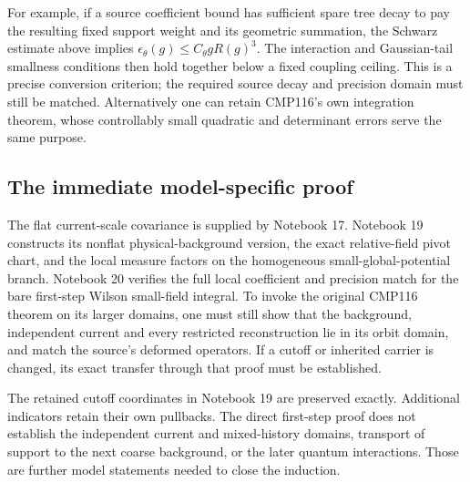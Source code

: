 For example, if a source coefficient bound has sufficient spare
tree decay to pay the resulting fixed support weight and its
geometric summation, the Schwarz estimate above implies
$\epsilon_\theta(g)\le C_\theta gR(g)^3$.
The interaction and Gaussian-tail smallness conditions then hold
together below a fixed coupling ceiling. This is a precise
conversion criterion; the required source decay and precision
domain must still be matched. Alternatively one can retain
CMP116's own integration theorem, whose controllably small
quadratic and determinant errors serve the same purpose.

\subsection{The immediate model-specific proof}

The flat current-scale covariance is supplied by Notebook 17.
Notebook 19 constructs its nonflat physical-background version,
the exact relative-field pivot chart, and the local measure
factors on the homogeneous small-global-potential branch.
Notebook 20 verifies the full local coefficient and precision
match for the bare first-step Wilson small-field integral.
To invoke the original CMP116 theorem on its larger domains,
one must still show that the background, independent current
and every restricted reconstruction lie in its orbit domain,
and match the source's deformed operators.
If a cutoff or inherited carrier is changed, its exact transfer
through that proof must be established.

The retained cutoff coordinates in Notebook 19 are preserved
exactly. Additional indicators retain their own pullbacks.
The direct first-step proof does not establish the independent
current and mixed-history domains, transport of support to the
next coarse background, or the later quantum interactions.
Those are further model statements needed to close the induction.

